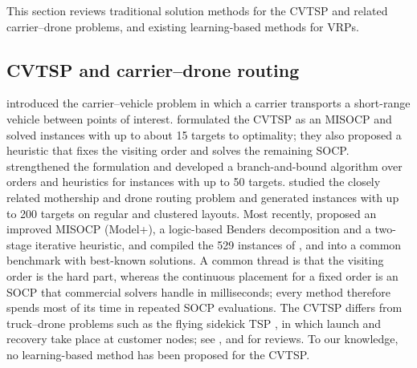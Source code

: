 \documentclass[preprint,review,12pt,authoryear]{elsarticle}
\begin{document}
This section reviews traditional solution methods for the CVTSP and related carrier--drone problems, and
existing learning-based methods for VRPs.

\subsection{CVTSP and carrier--drone routing}
\citet{garone2010cooperative} introduced the carrier--vehicle problem in which a carrier transports a
short-range vehicle between points of interest. \citet{gambella2018exact} formulated the CVTSP as an MISOCP
and solved instances with up to about 15 targets to optimality; they also proposed a heuristic that fixes the
visiting order and solves the remaining SOCP. \citet{erdogan2021exact} strengthened the formulation and developed
a branch-and-bound algorithm over orders and heuristics for instances with up to 50 targets.
\citet{poikonen2020mothership} studied the closely related mothership and drone routing problem and generated
instances with up to 200 targets on regular and clustered layouts. Most recently, \citet{li2025exact} proposed an
improved MISOCP (Model+), a logic-based Benders decomposition and a two-stage iterative heuristic, and compiled
the 529 instances of \citet{gambella2018exact}, \citet{erdogan2021exact} and \citet{poikonen2020mothership} into a
common benchmark with best-known solutions. A common thread is that the visiting order is the hard part, whereas
the continuous placement for a fixed order is an SOCP \citep{lobo1998applications} that commercial solvers handle
in milliseconds; every method therefore spends most of its time in repeated SOCP evaluations. The CVTSP differs
from truck--drone problems such as the flying sidekick TSP \citep{murray2015flying,agatz2018optimization}, in which
launch and recovery take place at customer nodes; see \citet{otto2018optimization}, \citet{macrina2020drone} and
\citet{chung2020optimization} for reviews. To our knowledge, no learning-based method has been proposed for the
CVTSP.
\end{document}
